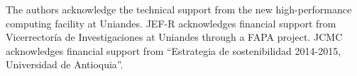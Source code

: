 \documentclass{emulateapj}
\begin{document}
\vspace{0.1cm}

 The authors acknowledge the technical support from the new
 high-performance computing facility at Uniandes. JEF-R acknowledges
 financial support from Vicerrector\'ia de Investigaciones at Uniandes
 through a FAPA project. JCMC acknowledges financial support from
 ``Estrategia de  sostenibilidad 2014-2015, Universidad de
 Antioquia''.    



\end{document}
